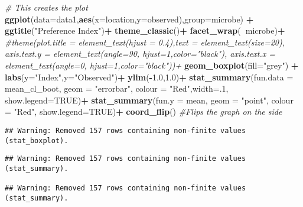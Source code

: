 \documentclass[]{article}
\newenvironment{Shaded}{\begin{snugshade}}{\end{snugshade}}
\newcommand{\KeywordTok}[1]{\textcolor[rgb]{0.13,0.29,0.53}{\textbf{#1}}}
\newcommand{\DataTypeTok}[1]{\textcolor[rgb]{0.13,0.29,0.53}{#1}}
\newcommand{\DecValTok}[1]{\textcolor[rgb]{0.00,0.00,0.81}{#1}}
\newcommand{\FloatTok}[1]{\textcolor[rgb]{0.00,0.00,0.81}{#1}}
\newcommand{\StringTok}[1]{\textcolor[rgb]{0.31,0.60,0.02}{#1}}
\newcommand{\CommentTok}[1]{\textcolor[rgb]{0.56,0.35,0.01}{\textit{#1}}}
\newcommand{\OtherTok}[1]{\textcolor[rgb]{0.56,0.35,0.01}{#1}}
\newcommand{\OperatorTok}[1]{\textcolor[rgb]{0.81,0.36,0.00}{\textbf{#1}}}
\newcommand{\NormalTok}[1]{#1}
\begin{document}
\begin{Shaded}
\begin{Highlighting}[]
\CommentTok{# This creates the plot}
\KeywordTok{ggplot}\NormalTok{(}\DataTypeTok{data=}\NormalTok{data1,}\KeywordTok{aes}\NormalTok{(}\DataTypeTok{x=}\NormalTok{location,}\DataTypeTok{y=}\NormalTok{observed),}\DataTypeTok{group=}\NormalTok{microbe) }\OperatorTok{+}\StringTok{ }
\StringTok{  }\KeywordTok{ggtitle}\NormalTok{(}\StringTok{"Preference Index"}\NormalTok{)}\OperatorTok{+}
\StringTok{  }\KeywordTok{theme_classic}\NormalTok{()}\OperatorTok{+}
\StringTok{  }\KeywordTok{facet_wrap}\NormalTok{(}\OperatorTok{~}\NormalTok{microbe)}\OperatorTok{+}
\StringTok{  }\CommentTok{#theme(plot.title = element_text(hjust = 0.4),text = element_text(size=20), axis.text.y = element_text(angle=90, hjust=1,color="black"), axis.text.x = element_text(angle=0, hjust=1,color="black"))+ }
\StringTok{  }\KeywordTok{geom_boxplot}\NormalTok{(}\DataTypeTok{fill=}\StringTok{"grey"}\NormalTok{) }\OperatorTok{+}\StringTok{ }
\StringTok{  }\KeywordTok{labs}\NormalTok{(}\DataTypeTok{y=}\StringTok{"Index"}\NormalTok{,}\DataTypeTok{y=}\StringTok{"Observed"}\NormalTok{)}\OperatorTok{+}
\StringTok{  }\KeywordTok{ylim}\NormalTok{(}\OperatorTok{-}\FloatTok{1.0}\NormalTok{,}\FloatTok{1.0}\NormalTok{)}\OperatorTok{+}
\StringTok{  }\KeywordTok{stat_summary}\NormalTok{(}\DataTypeTok{fun.data =}\NormalTok{ mean_cl_boot, }\DataTypeTok{geom =} \StringTok{"errorbar"}\NormalTok{, }\DataTypeTok{colour =} \StringTok{"Red"}\NormalTok{,}\DataTypeTok{width=}\NormalTok{.}\DecValTok{1}\NormalTok{, }\DataTypeTok{show.legend=}\OtherTok{TRUE}\NormalTok{)}\OperatorTok{+}
\StringTok{  }\KeywordTok{stat_summary}\NormalTok{(}\DataTypeTok{fun.y =}\NormalTok{ mean, }\DataTypeTok{geom =} \StringTok{"point"}\NormalTok{, }\DataTypeTok{colour =} \StringTok{"Red"}\NormalTok{, }\DataTypeTok{show.legend=}\OtherTok{TRUE}\NormalTok{)}\OperatorTok{+}
\StringTok{  }\KeywordTok{coord_flip}\NormalTok{() }\CommentTok{#Flips the graph on the side}
\end{Highlighting}
\end{Shaded}

\begin{verbatim}
## Warning: Removed 157 rows containing non-finite values (stat_boxplot).
\end{verbatim}

\begin{verbatim}
## Warning: Removed 157 rows containing non-finite values (stat_summary).

## Warning: Removed 157 rows containing non-finite values (stat_summary).
\end{verbatim}
\end{document}
